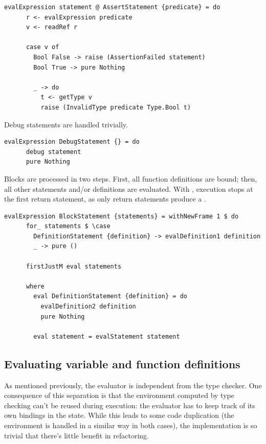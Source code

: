 \documentclass[UdineBachThesis,american,11pt,draft]{PhdThesis}
\begin{document}
  \begin{lstlisting}[gobble=4,basicstyle=\ttfamily\small]
    evalExpression statement @ AssertStatement {predicate} = do
      r <- evalExpression predicate
      v <- readRef r

      case v of
        Bool False -> raise (AssertionFailed statement)
        Bool True -> pure Nothing

        _ -> do
          t <- getType v
          raise (InvalidType predicate Type.Bool t)
  \end{lstlisting}

  Debug statements are handled trivially.

  \begin{lstlisting}[gobble=4,basicstyle=\ttfamily\small]
    evalExpression DebugStatement {} = do
      debug statement
      pure Nothing
  \end{lstlisting}

  Blocks are processed in two steps. First, all function definitions are bound;
  then, all other statements and/or definitions are evaluated. With
  \lstinline@firstJustM@, execution stops at the first return statement, as
  only return statements produce a \lstinline@Just@.

  \begin{lstlisting}[gobble=4,basicstyle=\ttfamily\small]
    evalExpression BlockStatement {statements} = withNewFrame 1 $ do
      for_ statements $ \case
        DefinitionStatement {definition} -> evalDefinition1 definition
        _ -> pure ()

      firstJustM eval statements

      where
        eval DefinitionStatement {definition} = do
          evalDefinition2 definition
          pure Nothing

        eval statement = evalStatement statement
  \end{lstlisting}

  \subsection{Evaluating variable and function definitions}

  As mentioned previously, the evaluator is independent from the type checker.
  One consequence of this separation is that the environment computed by type
  checking can't be reused during execution: the evaluator has to keep track of
  its own bindings in the state. While this leads to some code duplication (the
  environment is handled in a similar way in both cases), the implementation is
  so trivial that there's little benefit in refactoring.
\end{document}
